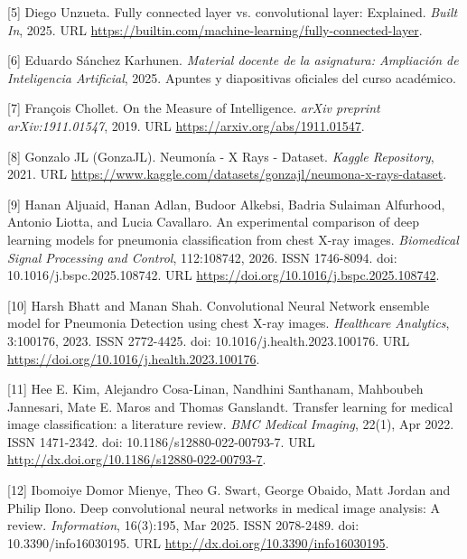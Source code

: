 \documentclass[11pt, a4paper]{article}
\numberwithin{equation}{section}
\begin{document}
\smallskip

\noindent \hypertarget{ref:5}{[5]} Diego Unzueta. Fully connected layer vs. convolutional layer: Explained. \textit{Built In}, 2025. URL \url{https://builtin.com/machine-learning/fully-connected-layer}.

\smallskip

\noindent \hypertarget{ref:6}{[6]} Eduardo Sánchez Karhunen. \textit{Material docente de la asignatura: Ampliación de Inteligencia Artificial}, 2025. Apuntes y diapositivas oficiales del curso académico.

\smallskip

\noindent \hypertarget{ref:7}{[7]} François Chollet. On the Measure of Intelligence. \textit{arXiv preprint arXiv:1911.01547}, 2019. URL \url{https://arxiv.org/abs/1911.01547}.

\smallskip

\noindent \hypertarget{ref:8}{[8]} Gonzalo JL (GonzaJL). Neumonía - X Rays - Dataset. \textit{Kaggle Repository}, 2021. URL \url{https://www.kaggle.com/datasets/gonzajl/neumona-x-rays-dataset}.

\smallskip

\noindent \hypertarget{ref:9}{[9]} Hanan Aljuaid, Hanan Adlan, Budoor Alkebsi, Badria Sulaiman Alfurhood, Antonio Liotta, and Lucia Cavallaro. An experimental comparison of deep learning models for pneumonia classification from chest X-ray images. \textit{Biomedical Signal Processing and Control}, 112:108742, 2026. ISSN 1746-8094. doi: 10.1016/j.bspc.2025.108742. URL \url{https://doi.org/10.1016/j.bspc.2025.108742}.

\smallskip

\noindent \hypertarget{ref:10}{[10]} Harsh Bhatt and Manan Shah. Convolutional Neural Network ensemble model for Pneumonia Detection using chest X-ray images. \textit{Healthcare Analytics}, 3:100176, 2023. ISSN 2772-4425. doi: 10.1016/j.health.2023.100176. URL \url{https://doi.org/10.1016/j.health.2023.100176}.

\smallskip

\noindent \hypertarget{ref:11}{[11]} Hee E. Kim, Alejandro Cosa-Linan, Nandhini Santhanam, Mahboubeh Jannesari, Mate E. Maros and Thomas Ganslandt. Transfer learning for medical image classification: a literature review. \textit{BMC Medical Imaging}, 22(1), Apr 2022. ISSN 1471-2342. doi: 10.1186/s12880-022-00793-7. URL \url{http://dx.doi.org/10.1186/s12880-022-00793-7}.

\smallskip

\noindent \hypertarget{ref:12}{[12]} Ibomoiye Domor Mienye, Theo G. Swart, George Obaido, Matt Jordan and Philip Ilono. Deep convolutional neural networks in medical image analysis: A review. \textit{Information}, 16(3):195, Mar 2025. ISSN 2078-2489. doi: 10.3390/info16030195. URL \url{http://dx.doi.org/10.3390/info16030195}.
\end{document}
